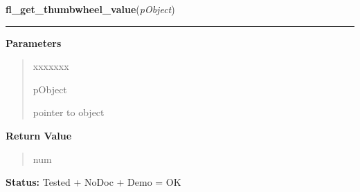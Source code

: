     \label{xformslib:library:fl_get_thumbwheel_value}

    \vspace{0.5ex}

\hspace{.8\funcindent}\begin{boxedminipage}{\funcwidth}

    \raggedright \textbf{fl\_get\_thumbwheel\_value}(\textit{pObject})

    \vspace{-1.5ex}

    \rule{\textwidth}{0.5\fboxrule}
\setlength{\parskip}{2ex}
\setlength{\parskip}{1ex}
      \textbf{Parameters}
      \vspace{-1ex}

      \begin{quote}
        \begin{Ventry}{xxxxxxx}

          \item[pObject]

          pointer to object

        \end{Ventry}

      \end{quote}

      \textbf{Return Value}
    \vspace{-1ex}

      \begin{quote}
      num

      \end{quote}

\textbf{Status:} Tested + NoDoc + Demo = OK



    \end{boxedminipage}

    \label{xformslib:library:fl_set_thumbwheel_value}

    \vspace{0.5ex}


